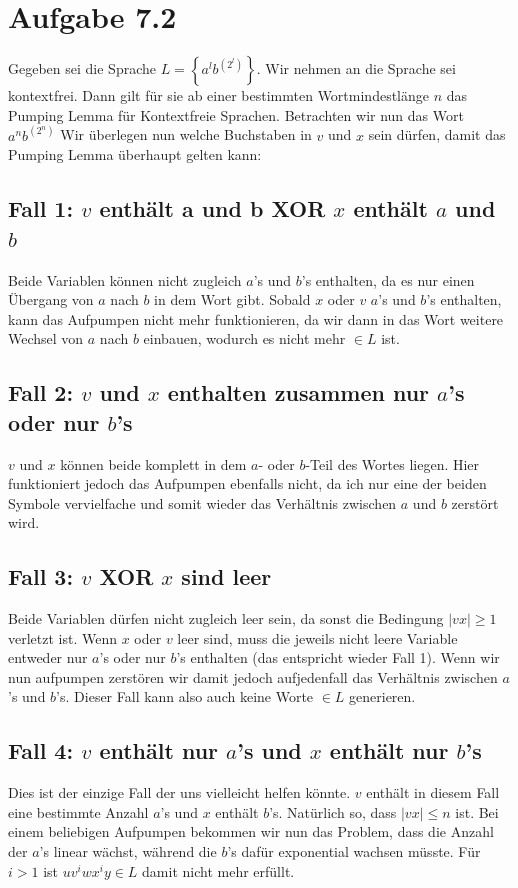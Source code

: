 \documentclass{article}
\begin{document}
\section*{Aufgabe 7.2}
Gegeben sei die Sprache $L = \left\{ a^lb^{\left(2^l\right)} \right\}$. Wir nehmen an die Sprache sei kontextfrei. Dann gilt für sie ab einer bestimmten Wortmindestlänge $n$ das Pumping Lemma für Kontextfreie Sprachen. Betrachten wir nun das Wort $a^nb^{\left(2^n\right)}$ Wir überlegen nun welche Buchstaben in $v$ und $x$ sein dürfen, damit das Pumping Lemma überhaupt gelten kann:

\subsection*{Fall 1: $v$ enthält a und b XOR $x$ enthält $a$ und $b$}
Beide Variablen können nicht zugleich $a$'s und $b$'s enthalten, da es nur einen Übergang von $a$ nach $b$ in dem Wort gibt. Sobald $x$ oder $v$ $a$'s und $b$'s enthalten, kann das Aufpumpen nicht mehr funktionieren, da wir dann in das Wort weitere Wechsel von $a$ nach $b$ einbauen, wodurch es nicht mehr $\in L$ ist.

\subsection*{Fall 2: $v$ und $x$ enthalten zusammen nur $a$'s oder nur $b$'s}
$v$ und $x$ können beide komplett in dem $a$- oder $b$-Teil des Wortes liegen. Hier funktioniert jedoch das Aufpumpen ebenfalls nicht, da ich nur eine der beiden Symbole vervielfache und somit wieder das Verhältnis zwischen $a$ und $b$ zerstört wird.

\subsection*{Fall 3: $v$ XOR $x$ sind leer}
Beide Variablen dürfen nicht zugleich leer sein, da sonst die Bedingung $|vx|\geq 1$ verletzt ist. Wenn $x$ oder $v$ leer sind, muss die jeweils nicht leere Variable entweder nur $a$'s oder nur $b$'s enthalten (das entspricht wieder Fall 1). Wenn wir nun aufpumpen zerstören wir damit jedoch aufjedenfall das Verhältnis zwischen $a$'s und $b$'s. Dieser Fall kann also auch keine Worte $\in L$ generieren.

\subsection*{Fall 4: $v$ enthält nur $a$'s und $x$ enthält nur $b$'s}
Dies ist der einzige Fall der uns vielleicht helfen könnte. $v$ enthält in diesem Fall eine bestimmte Anzahl $a$'s und $x$ enthält $b$'s. Natürlich so, dass $|vx| \leq n$ ist. Bei einem beliebigen Aufpumpen bekommen wir nun das Problem, dass die Anzahl der $a$'s linear wächst, während die $b$'s dafür exponential wachsen müsste. Für $i>1$ ist $uv^iwx^iy\in L$ damit nicht mehr erfüllt.
\end{document}
